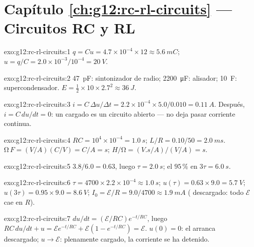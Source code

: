 \section*{Capítulo \ref{ch:g12:rc-rl-circuits} --- Circuitos RC y RL}

\begin{solution}{exo:g12:rc-rl-circuits:1}
$q = Cu = 4.7\times10^{-4} \times 12 \approx \qty{5.6}{mC}$;
$u = q/C = 2.0\times10^{-3}/10^{-4} = \qty{20}{V}$.
\end{solution}

\begin{solution}{exo:g12:rc-rl-circuits:2}
\qty{47}{pF}: sintonizador de radio; \qty{2200}{\micro F}: alisador;
\qty{10}{F}: supercondensador.
$E = \tfrac12 \times 10 \times 2.7^2 \approx \qty{36}{J}$.
\end{solution}

\begin{solution}{exo:g12:rc-rl-circuits:3}
$i = C\,\Delta u/\Delta t = 2.2\times10^{-4} \times 5.0/0.010 =
\qty{0.11}{A}$. Después, $i = C\,du/dt = 0$: un  cargado es
un circuito abierto --- no deja pasar corriente continua.
\end{solution}

\begin{solution}{exo:g12:rc-rl-circuits:4}
$RC = 10^4 \times 10^{-4} = \qty{1.0}{s}$;
$L/R = 0.10/50 = \qty{2.0}{ms}$.
$\unit{\ohm}\,\unit{F} = (\unit{V/A})(\unit{C/V}) = \unit{C/A} =
\unit{s}$;
$\unit{H}/\unit{\ohm} = (\unit{V.s/A})/(\unit{V/A}) = \unit{s}$.
\end{solution}

\begin{solution}{exo:g12:rc-rl-circuits:5}
$3.8/6.0 = 0.63$, luego $\tau = \qty{2.0}{s}$; el $95\,\%$ en
$3\tau = \qty{6.0}{s}$.
\end{solution}

\begin{solution}{exo:g12:rc-rl-circuits:6}
$\tau = 4700 \times 2.2\times10^{-4} \approx \qty{1.0}{s}$;
$u(\tau) = 0.63 \times 9.0 = \qty{5.7}{V}$;
$u(3\tau) = 0.95 \times 9.0 = \qty{8.6}{V}$;
$I_0 = \mathcal{E}/R = 9.0/4700 \approx \qty{1.9}{mA}$ (
descargado: todo $\mathcal{E}$ cae en $R$).
\end{solution}

\begin{solution}{exo:g12:rc-rl-circuits:7}
$du/dt = (\mathcal{E}/RC)e^{-t/RC}$, luego
$RC\,du/dt + u = \mathcal{E}e^{-t/RC} + \mathcal{E}(1 - e^{-t/RC}) =
\mathcal{E}$. $u(0) = 0$: el  arranca descargado;
$u \to \mathcal{E}$: plenamente cargado, la corriente se ha detenido.
\end{solution}

